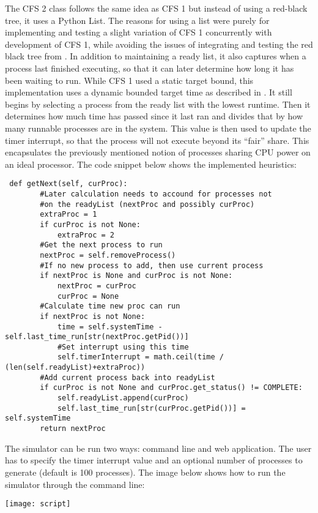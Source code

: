 \documentclass[a4paper]{article}
\begin{document}
The CFS 2 class follows the same idea as CFS 1 but instead of using a red-black tree, it uses a Python List. The reasons for using a list were purely for implementing and testing a slight variation of CFS 1 concurrently with development of CFS 1, while avoiding the issues of integrating and testing the red black tree from \cite{rb-tree}. In addition to maintaining a ready list, it also captures when a process last finished executing, so that it can later determine how long it has been waiting to run. While CFS 1 used a static target bound, this implementation uses a dynamic bounded target time as described in \cite{ishkov}. It still begins by selecting a process from the ready list with the lowest runtime. Then it determines how much time has passed since it last ran and divides that by how many runnable processes are in the system. This value is then used to update the timer interrupt, so that the process will not execute beyond its “fair” share. This encapsulates the previously mentioned notion of processes sharing CPU power on an ideal processor. The code snippet below shows the implemented heuristics:


\begin{lstlisting}
 def getNext(self, curProc):
        #Later calculation needs to accound for processes not
        #on the readyList (nextProc and possibly curProc)
        extraProc = 1
        if curProc is not None:
            extraProc = 2
        #Get the next process to run
        nextProc = self.removeProcess()
        #If no new process to add, then use current process
        if nextProc is None and curProc is not None:
            nextProc = curProc
            curProc = None
        #Calculate time new proc can run
        if nextProc is not None:
            time = self.systemTime - self.last_time_run[str(nextProc.getPid())]
            #Set interrupt using this time
            self.timerInterrupt = math.ceil(time / (len(self.readyList)+extraProc))
        #Add current process back into readyList
        if curProc is not None and curProc.get_status() != COMPLETE:
            self.readyList.append(curProc)
            self.last_time_run[str(curProc.getPid())] = self.systemTime
        return nextProc
\end{lstlisting}

The simulator can be run two ways: command line and web application. The user has to specify the timer interrupt value and an optional number of processes to generate (default is 100 processes). The image below shows how to run the simulator through the command line:
\begin{center}
\texttt{[image: script]}
\end{center}
\end{document}
